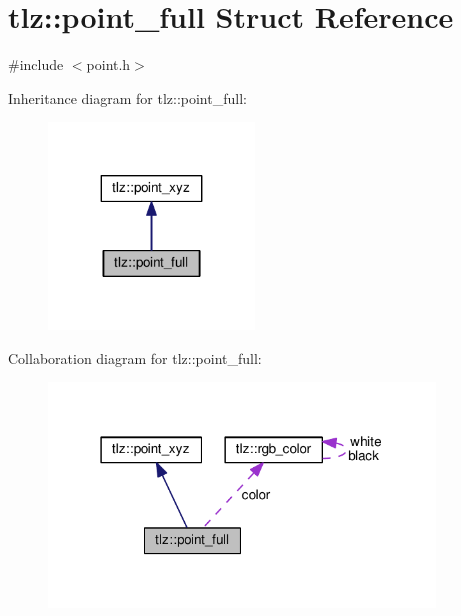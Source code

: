 \hypertarget{structtlz_1_1point__full}{}\section{tlz\+:\+:point\+\_\+full Struct Reference}
\label{structtlz_1_1point__full}


{\ttfamily \#include $<$point.\+h$>$}



Inheritance diagram for tlz\+:\+:point\+\_\+full\+:
\nopagebreak
\begin{figure}[H]
\begin{center}
\leavevmode
\includegraphics[width=155pt]{structtlz_1_1point__full__inherit__graph}
\end{center}
\end{figure}


Collaboration diagram for tlz\+:\+:point\+\_\+full\+:
\nopagebreak
\begin{figure}[H]
\begin{center}
\leavevmode
\includegraphics[width=291pt]{structtlz_1_1point__full__coll__graph}
\end{center}
\end{figure}

